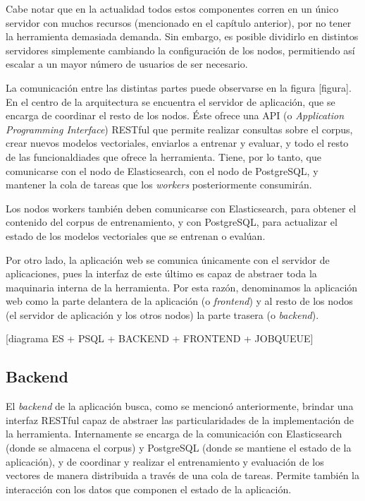 Cabe notar que en la actualidad todos estos componentes corren en un único servidor con muchos
recursos (mencionado en el capítulo anterior), por no tener la herramienta demasiada demanda. Sin
embargo, es posible dividirlo en distintos servidores simplemente cambiando la configuración de los
nodos, permitiendo así escalar a un mayor número de usuarios de ser necesario.

La comunicación entre las distintas partes puede observarse en la figura [figura]. En el centro de
la arquitectura se encuentra el servidor de aplicación, que se encarga de coordinar el resto de los
nodos. Éste ofrece una API (o \textit{Application Programming Interface}) RESTful que permite
realizar consultas sobre el corpus, crear nuevos modelos vectoriales, enviarlos a entrenar y
evaluar, y todo el resto de las funcionaldiades que ofrece la herramienta. Tiene, por lo tanto, que
comunicarse con el nodo de Elasticsearch, con el nodo de PostgreSQL, y mantener la cola de tareas
que los \textit{workers} posteriormente consumirán.

Los nodos workers también deben comunicarse con Elasticsearch, para obtener el contenido del
corpus de entrenamiento, y con PostgreSQL, para actualizar el estado de los modelos vectoriales que
se entrenan o evalúan.

Por otro lado, la aplicación web se comunica únicamente con el servidor de aplicaciones, pues la
interfaz de este último es capaz de abstraer toda la maquinaria interna de la herramienta. Por esta
razón, denominamos la aplicación web como la parte delantera de la aplicación (o \textit{frontend})
y al resto de los nodos (el servidor de aplicación y los otros nodos) la parte trasera (o
\textit{backend}).

[diagrama ES + PSQL + BACKEND + FRONTEND + JOBQUEUE]


\subsection{Backend}

El \textit{backend} de la aplicación busca, como se mencionó anteriormente, brindar una interfaz
RESTful capaz de abstraer las particularidades de la implementación de la herramienta. Internamente
se encarga de la comunicación con Elasticsearch (donde se almacena el corpus) y PostgreSQL (donde se
mantiene el estado de la aplicación), y de coordinar y realizar el entrenamiento y evaluación de los
vectores de manera distribuida a través de una cola de tareas. Permite también la interacción con
los datos que componen el estado de la aplicación.


